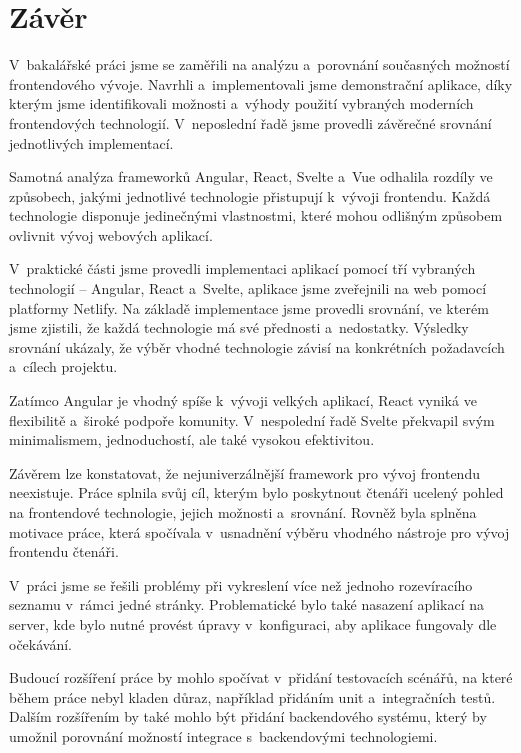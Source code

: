 \section*{Závěr}

V~bakalářské práci jsme se zaměřili na analýzu a~porovnání současných možností frontendového vývoje. 
Navrhli a~implementovali jsme demonstrační aplikace, díky kterým jsme identifikovali možnosti a~výhody použití vybraných moderních frontendových technologií. 
V~neposlední řadě jsme provedli závěrečné srovnání jednotlivých implementací.

Samotná analýza frameworků Angular, React, Svelte a~Vue odhalila rozdíly ve způsobech, jakými jednotlivé technologie přistupují k~vývoji frontendu. 
Každá technologie disponuje jedinečnými vlastnostmi, které mohou odlišným způsobem ovlivnit vývoj webových aplikací. 

V~praktické části jsme provedli implementaci aplikací pomocí tří vybraných technologií -- Angular, React a~Svelte, aplikace jsme zveřejnili na web pomocí platformy Netlify. 
Na základě implementace jsme provedli srovnání, ve kterém jsme zjistili, že každá technologie má své přednosti a~nedostatky. 
Výsledky srovnání ukázaly, že výběr vhodné technologie závisí na konkrétních požadavcích a~cílech projektu.

Zatímco Angular je vhodný spíše k~vývoji velkých aplikací, React vyniká ve flexibilitě a~široké podpoře komunity. 
V~nespolední řadě Svelte překvapil svým minimalismem, jednoduchostí, ale také vysokou efektivitou.

Závěrem lze konstatovat, že nejuniverzálnější framework pro vývoj frontendu neexistuje. 
Práce splnila svůj cíl, kterým bylo poskytnout čtenáři ucelený pohled na frontendové technologie, jejich možnosti a~srovnání.
Rovněž byla splněna motivace práce, která spočívala v~usnadnění výběru vhodného nástroje pro vývoj frontendu čtenáři.

V~práci jsme se řešili problémy při vykreslení více než jednoho rozevíracího seznamu v~rámci jedné stránky. 
Problematické bylo také nasazení aplikací na server, kde bylo nutné provést úpravy v~konfiguraci, aby aplikace fungovaly dle očekávání.

Budoucí rozšíření práce by mohlo spočívat v~přidání testovacích scénářů, na které během práce nebyl kladen důraz, například přidáním unit a~integračních testů.
Dalším rozšířením by také mohlo být přidání backendového systému, který by umožnil porovnání možností integrace s~backendovými technologiemi.

